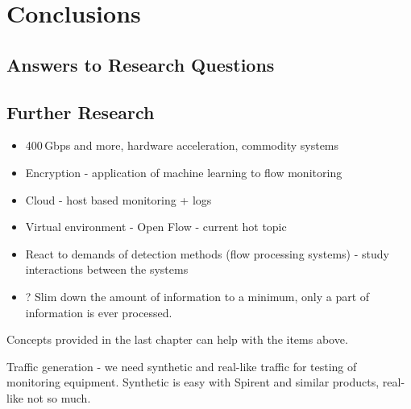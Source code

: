 \chapter{Conclusions}\label{chap:conclusions}

\section{Answers to Research Questions}

\section{Further Research}

\begin{itemize}
  \item 400\,Gbps and more, hardware acceleration, commodity systems
  \item Encryption - application of machine learning to flow monitoring
  \item Cloud - host based monitoring + logs
  \item Virtual environment - Open Flow - current hot topic
  \item React to demands of detection methods (flow processing systems) - study interactions between the systems
  \item ? Slim down the amount of information to a minimum, only a part of information is ever processed.
\end{itemize}

Concepts provided in the last chapter can help with the items above.

Traffic generation - we need synthetic and real-like traffic for testing of monitoring equipment. Synthetic is easy with Spirent and similar products, real-like not so much.